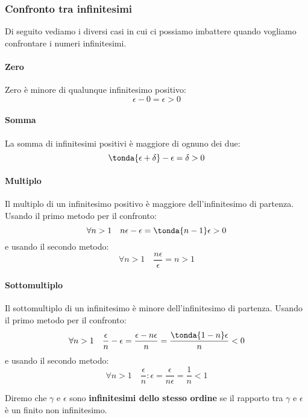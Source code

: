 \subsubsection{Confronto tra infinitesimi}
\label{subsubsec:insnum_confrontoreali}

Di seguito vediamo i diversi casi in cui ci possiamo 
imbattere quando vogliamo confrontare i numeri infinitesimi.

\paragraph{Zero}
Zero è minore di qualunque infinitesimo positivo:
\[\epsilon-0 = \epsilon>0\]
\paragraph{Somma}
La somma di infinitesimi positivi è maggiore di ognuno dei due:
\[\tonda{\epsilon+\delta}-\epsilon = \delta > 0\]
\paragraph{Multiplo}
Il multiplo di un infinitesimo positivo è maggiore dell'infinitesimo di 
partenza. Usando il primo metodo per il confronto:
\[\forall n > 1 \quad n\epsilon-\epsilon = \tonda{n-1}\epsilon > 0\]
e usando il secondo metodo: 
\[\forall n > 1 \quad \frac{n\epsilon}{\epsilon} = n > 1\]
\paragraph{Sottomultiplo}
Il sottomultiplo di un infinitesimo è minore dell'infinitesimo di partenza. 
Usando il primo metodo per il confronto:
\[\forall n > 1 \quad \frac{\epsilon}{n}-\epsilon = 
                      \frac{\epsilon-n\epsilon}{n} = 
                      \frac{\tonda{1-n}\epsilon}{n} < 0\]
e usando il secondo metodo: 
\[\forall n > 1 \quad \frac{\epsilon}{n}:\epsilon =
                      \frac{\epsilon}{n\epsilon} =
                      \frac{1}{n} < 1\]
\begin{definizione}
 Diremo che \(\gamma\) e \(\epsilon\) sono \textbf{infinitesimi dello 
stesso ordine} se il rapporto tra \(\gamma\) e \(\epsilon\) è un 
finito non infinitesimo.
\end{definizione}
